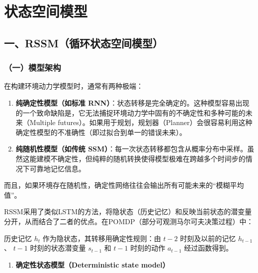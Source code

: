 \setcounter{section}{2}

\hypertarget{ux72b6ux6001ux7a7aux95f4ux6a21ux578b}{%
\section{状态空间模型}\label{ux72b6ux6001ux7a7aux95f4ux6a21ux578b}}

\hypertarget{ux4e00rssmux5faaux73afux72b6ux6001ux7a7aux95f4ux6a21ux578b}{%
\subsection{一、RSSM（循环状态空间模型）}\label{ux4e00rssmux5faaux73afux72b6ux6001ux7a7aux95f4ux6a21ux578b}}

\hypertarget{ux4e00ux6a21ux578bux67b6ux6784}{%
\subsubsection{（一）模型架构}\label{ux4e00ux6a21ux578bux67b6ux6784}}

在构建环境动力学模型时，通常有两种极端：

\begin{enumerate}
\def\labelenumi{\arabic{enumi}.}
\item
  \textbf{纯确定性模型（如标准 RNN）}：状态转移是完全确定的。这种模型容易出现的一个致命缺陷是，它无法捕捉环境动力学中固有的不确定性和多种可能的未来（Multiple futures）。如果用于规划，规划器（Planner）会很容易利用这种确定性模型的不准确性（即过拟合到单一的错误未来）。
\item
  \textbf{纯随机性模型（如传统 SSM）}：每一次状态转移都包含从概率分布中采样。虽然这能建模不确定性，但纯粹的随机转换使得模型极难在跨越多个时间步的情况下可靠地记忆信息。
\end{enumerate}

而且，如果环境存在随机性，确定性网络往往会输出所有可能未来的``模糊平均值''。

RSSM采用了类似LSTM的方法，将隐状态（历史记忆）和反映当前状态的潜变量分开，从而结合了二者的优点。在POMDP（部分可观测马尔可夫决策过程）中：

历史记忆 \(h_t\) 作为隐状态，其转移用确定性规则：由 \(t-2\) 时刻及以前的记忆 \(h_{t-1}\)、 \(t-1\) 时刻的状态潜变量 \(s_{t-1}\) 和 \(t-1\) 时刻的动作 \(a_{t-1}\) 经过函数得到。

\begin{enumerate}
\def\labelenumi{\arabic{enumi}.}
\tightlist
\item
  \textbf{确定性状态模型（Deterministic state model）}
\end{enumerate}

